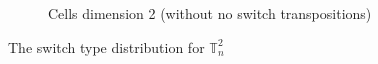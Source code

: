 \documentclass{article}
\begin{document}
\begin{figure}[htbp]
\begin{subfigure}[b]{0.3\textwidth}
    \caption{Cells dimension 2 (without no switch transpositions)}
    \label{fig:complex2cells2onlyswitch}
\end{subfigure}
\caption{The switch type distribution for $\mathbb{T}_n^{2}$}
\label{typesdistribution2}
\end{figure}
\end{document}
